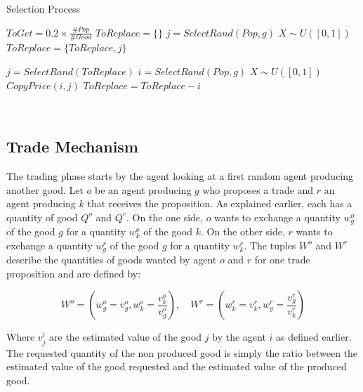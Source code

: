 \documentclass[a4paper]{article}
\begin{document}
\begin{algorithm}
\caption{Selection Process}
\label{algo:selectionCulture}
	\begin{algorithmic}[1]
	\State	$ToGet = 0.2 \times \frac{\#Pop}{\#Good}$
		\State	$ToReplace = \{\}$
			\State $ j = SelectRand(Pop,g) $ 
			\State $X \sim U([0,1])$ 
			 
				\State $ToReplace = \{ToReplace,j\}$
			\EndIf
		\EndWhile

			\State $ j = SelectRand(ToReplace) $ 
			\State $ i = SelectRand(Pop,g) $  
			\State $X \sim U([0,1])$ 
			 
				 
					\State $CopyPrice(i,j)$
					\State $ToReplace = ToReplace - i$
				\EndIf
			\EndIf

		\EndWhile\
	\EndFor
\end{algorithmic}
\end{algorithm}


\subsection{Trade Mechanism}
The trading phase starts by the agent looking at a first random agent producing another good. 
Let $o$ be an agent producing $g$ who proposes a trade and $r$ an agent producing $k$ that receives the proposition. As explained earlier, each has a quantity of good $Q^o$ and $Q^r$. On the one side, $o$ wants to exchange a quantity $w_g^o$ of the good $g$ for a quantity $w_k^o$ of the good $k$. On the other side, $r$ wants to exchange a quantity $w_g^r$ of the good $g$ for a quantity $w_k^r$. The tuples $W^o$ and $W^r$ describe the quantities of goods wanted by agent $o$ and $r$ for one trade proposition and are defined by:  

\begin{equation}
	 W^o=(w_g^o = v_g^o,w_k^o= \frac{v_k^o}{v_g^o}), \quad
	 W^r=(w_k^r = v_k^r,w_g^r= \frac{v_g^r}{v_k^r}) 
	 \label{eq:trade}
\end{equation}

 Where $v_j^i$ are the estimated value of the good $j$ by the agent $i$ as defined earlier. 
The requested quantity of the non produced good is simply the ratio between the estimated value of the good requested and the estimated value of the produced good.
\end{document}
